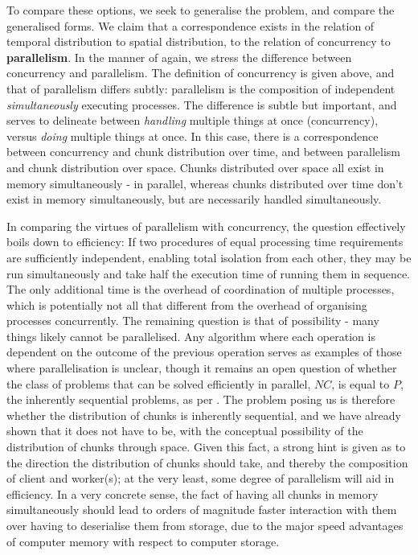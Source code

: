 To compare these options, we seek to generalise the problem, and compare the generalised forms.
We claim that a correspondence exists in the relation of temporal distribution to spatial distribution, to the relation of concurrency to \textbf{parallelism}.
In the manner of \textcite{pike2012concurrency} again, we stress the difference between concurrency and parallelism.
The definition of concurrency is given above, and that of parallelism differs subtly: parallelism is the composition of independent \emph{simultaneously} executing processes.
The difference is subtle but important, and serves to delineate between \emph{handling} multiple things at once (concurrency), versus \emph{doing} multiple things at once.
In this case, there is a correspondence between concurrency and chunk distribution over time, and between parallelism and chunk distribution over space.
Chunks distributed over space all exist in memory simultaneously - in parallel, whereas chunks distributed over time don't exist in memory simultaneously, but are necessarily handled simultaneously.

In comparing the virtues of parallelism with concurrency, the question effectively boils down to efficiency: If two procedures of equal processing time requirements are sufficiently independent, enabling total isolation from each other, they may be run simultaneously and take half the execution time of running them in sequence.
The only additional time is the overhead of coordination of multiple processes, which is potentially not all that different from the overhead of organising processes concurrently.
The remaining question is that of possibility - many things likely cannot be parallelised.
Any algorithm where each operation is dependent on the outcome of the previous operation serves as examples of those where parallelisation is unclear, though it remains an open question of whether the class of problems that can be solved efficiently in parallel, \(NC\), is equal to \(P\), the inherently sequential problems, as per \textcite{cook1985}.
The problem posing us is therefore whether the distribution of chunks is inherently sequential, and we have already shown that it does not have to be, with the conceptual possibility of the distribution of chunks through space.
Given this fact, a strong hint is given as to the direction the distribution of chunks should take, and thereby the composition of client and worker(s); at the very least, some degree of parallelism will aid in efficiency.
In a very concrete sense, the fact of having all chunks in memory simultaneously should lead to orders of magnitude faster interaction with them over having to deserialise them from storage, due to the major speed advantages of computer memory with respect to computer storage.

